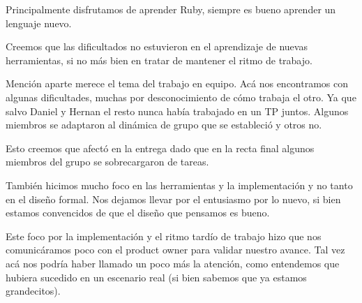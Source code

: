 Principalmente disfrutamos de aprender Ruby, siempre es bueno aprender un lenguaje nuevo.

Creemos que las dificultados no estuvieron en el aprendizaje de nuevas herramientas, si no más bien en tratar de mantener el ritmo de trabajo.

Mención aparte merece el tema del trabajo en equipo. Acá nos encontramos con algunas dificultades, muchas por desconocimiento de cómo trabaja el otro. Ya que salvo Daniel y Hernan el resto nunca había trabajado en un TP juntos. Algunos miembros se adaptaron al dinámica de grupo que se estableció y otros no. 

Esto creemos que afectó en la entrega dado que en la recta final algunos miembros del grupo se sobrecargaron de tareas.

También hicimos mucho foco en las herramientas y la implementación y no tanto en el diseño formal. Nos dejamos llevar por el entusiasmo por lo nuevo, si bien estamos convencidos de que el diseño que pensamos es bueno.

Este foco por la implementación y el ritmo tardío de trabajo hizo que nos comunicáramos poco con el product owner para validar nuestro avance. Tal vez acá nos podría haber llamado un poco más la atención, como entendemos que hubiera sucedido en un escenario real (si bien sabemos que ya estamos grandecitos).
